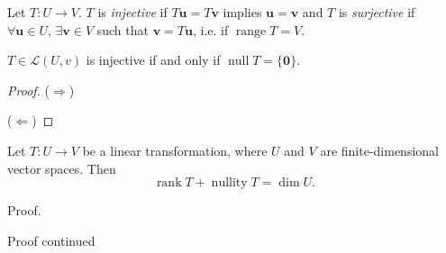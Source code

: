 \documentclass [aspectratio=169]{beamer}
\newcommand{\bu}{{\mathbf{u}}}
\newcommand{\bv}{{\mathbf{v}}}
\newcommand{\zerovec}{{\mathbf{0}}}
\newcommand{\cL}{{\mathcal{L}}}
\DeclareMathOperator{\range}{range}
\DeclareMathOperator{\rank}{rank}
\DeclareMathOperator{\nullspace}{null}
\DeclareMathOperator{\nullity}{nullity}
\begin{document}
\begin{frame}
\begin{definition}
Let $T:U \to V$. $T$ is \emph{injective} if $T\bu = T\bv$ implies $\bu = \bv$ and $T$ is \emph{surjective} if $\forall \bu \in U, \, \exists \bv \in V$ such that $\bv = T\bu$, i.e. if $\range T = V$.
\end{definition}

\vspace{3em}

\begin{theorem}
$T \in \cL(U,v)$ is injective if and only if $\nullspace T = \{ \zerovec \}$.
\end{theorem}
\end{frame}

\begin{frame}
\begin{proof}
($\Rightarrow$) 

\vspace{3cm}

($\Leftarrow$) 


\vspace{2cm}

\end{proof}


\end{frame}




\begin{frame}
\begin{theorem}
Let $T:U \to V$ be a linear transformation, where $U$ and $V$ are finite-dimensional vector spaces. Then  
\begin{equation*}
\rank T + \nullity  T = \dim U.
\end{equation*}
\end{theorem}
\begin{block}{Proof.}
\vspace{4cm}
\end{block}
\end{frame}


\begin{frame}
\begin{block}{Proof continued}

\vspace{5.5cm}
\end{block}
\end{frame}
\end{document}
